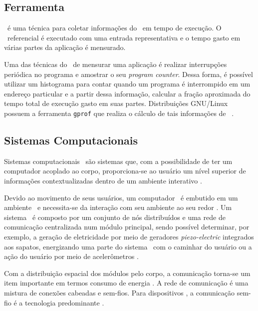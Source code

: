 \subsection{Ferramenta \Profile} \label{sec:profile}

		\Profile\ é uma técnica para coletar informações do \software\ em tempo de execução. O \software\ referencial é executado com uma entrada representativa e o tempo gasto em várias partes da aplicação é mensurado. 

		Uma das técnicas do \profile\ de mensurar uma aplicação é realizar interrupções periódica no programa e amostrar o seu \textit{program counter}. Dessa forma, é possível utilizar um histograma para contar quando um programa é interrompido em um endereço particular e a partir dessa informação, calcular a fração aproximada do tempo total de execução gasto em suas partes. Distribuições GNU/Linux possuem a ferramenta \texttt{gprof} que realiza o cálculo de tais informações de \software\ \cite{Graham1982}.



\subsection{Sistemas Computacionais \Wearables}
	Sistemas computacionais \wearables\ são sistemas que, com a possibilidade de ter um computador acoplado ao corpo, proporciona-se ao usuário um nível superior de informações contextualizadas dentro de um ambiente interativo \cite{Amorim2017}.


	Devido ao movimento de seus usuários, um computador \wearable\ é embutido em um ambiente \mobile\ e necessita-se da interação com seu ambiente ao seu redor \cite{Plessl2003}.
	Um sistema \wearable\ é composto por um conjunto de nós distribuídos e uma rede de comunicação centralizada num módulo principal, sendo possível determinar, por exemplo, a geração de eletricidade por meio de geradores \textit{piezo-electric} integrados aos sapatos, energizando uma parte do sistema \wearable\ com o caminhar do usuário \cite{Kymissis1998} ou a ação do usuário por meio de acelerômetros \cite{VanLaerhoven2002, Kern2002}.

	Com a distribuição espacial dos módulos pelo corpo, a comunicação torna-se um item importante em termos consumo de energia \cite{Kymissis1998}. A rede de comunicação é uma mistura de conexões cabeadas e sem-fios. Para dispositivos \wearables, a comunicação sem-fio é a tecnologia predominante \cite{Plessl2003}.

